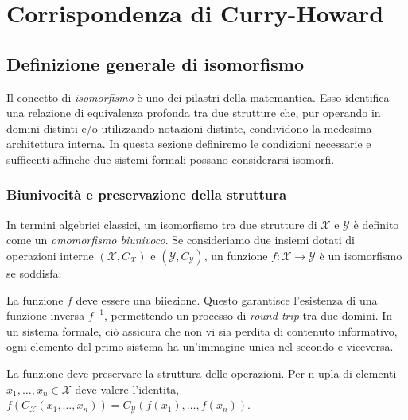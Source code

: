 \chapter{Corrispondenza di Curry-Howard}
\label{chap:curry_howard_isomorphism}

\section{Definizione generale di isomorfismo}
Il concetto di \emph{isomorfismo} è uno dei pilastri della matemantica. Esso identifica una relazione di equivalenza 
profonda tra due strutture che, pur operando in domini distinti e/o utilizzando notazioni distinte, condividono la 
medesima architettura interna. In questa sezione definiremo le condizioni necessarie e sufficenti affinche due sistemi 
formali possano considerarsi isomorfi. 

\subsection{Biunivocità e preservazione della struttura}
In termini algebrici classici, un isomorfismo tra due strutture di $\mathcal{X}$ e $\mathcal{Y}$ è definito come un 
\emph{omomorfismo biunivoco}. Se consideriamo due insiemi dotati di operazioni interne $(\mathcal{X}, C_{\mathcal{X}})$ 
e $(\mathcal{Y}, C_{\mathcal{Y}})$, un funzione $f: \mathcal{X} \to \mathcal{Y}$ è un isomorfismo se soddisfa:

\begin{description}[leftmargin=1.5em, style=nextline, font=\bfseries]
    \item[Biunivocità] 
        La funzione $f$ deve essere una biiezione. Questo garantisce l'esistenza di una funzione inversa $f^{-1}$, permettendo
        un processo di \emph{round-trip} tra due domini. In un sistema formale, ciò assicura che non vi sia perdita di contenuto 
        informativo, ogni elemento del primo sistema ha un'immagine unica nel secondo e viceversa.
    \item[Omomorfismo]
        La funzione deve preservare la struttura delle operazioni. Per n-upla di elementi $x_1, \dots, x_n \in \mathcal{X}$ deve 
        valere l'identita, $f(C_{\mathcal{X}}(x_1, \dots, x_n)) = C_{\mathcal{Y}}(f(x_1), \dots, f(x_n))$.
\end{description}

